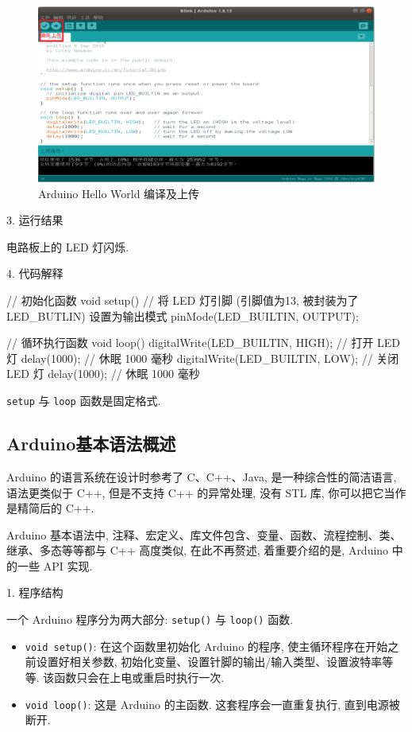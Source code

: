 \documentclass[openany, fontset=windowsold]{ctexbook}
\theoremstyle{kaiti}
\theoremstyle{normal}
\begin{document}
\begin{figure}[!ht]
  \centering
  \includegraphics[width=.9\textwidth]{arduino_HelloWorld_compile.png}
  \caption{Arduino Hello World 编译及上传}
  \label{fig:arduino_HelloWorld_compile}
\end{figure}

3. 运行结果

电路板上的 LED 灯闪烁.

4. 代码解释

\begin{cpp}
  // 初始化函数
  void setup() {
    // 将 LED 灯引脚 (引脚值为13, 被封装为了 LED_BUTLIN) 设置为输出模式
    pinMode(LED_BUILTIN, OUTPUT);
  }

  // 循环执行函数
  void loop() {
    digitalWrite(LED_BUILTIN, HIGH);   // 打开 LED 灯
    delay(1000);                       // 休眠 1000 毫秒
    digitalWrite(LED_BUILTIN, LOW);    // 关闭 LED 灯
    delay(1000);                       // 休眠 1000 毫秒
  }
\end{cpp}

\verb|setup| 与 \verb|loop| 函数是固定格式.

\subsection{Arduino基本语法概述}

Arduino 的语言系统在设计时参考了 C、C++、Java, 是一种综合性的简洁语言, 语法更类似于 C++, 但是不支持 C++ 的异常处理, 没有 STL 库, 你可以把它当作是精简后的 C++.

Arduino 基本语法中, 注释、宏定义、库文件包含、变量、函数、流程控制、类、继承、多态等等都与 C++ 高度类似, 在此不再赘述, 着重要介绍的是, Arduino 中的一些 API 实现.

1. 程序结构

一个 Arduino 程序分为两大部分: \verb|setup()| 与 \verb|loop()| 函数.

\begin{itemize}
  \item \verb|void setup()|: 在这个函数里初始化 Arduino 的程序, 使主循环程序在开始之前设置好相关参数, 初始化变量、设置针脚的输出/输入类型、设置波特率等等. 该函数只会在上电或重启时执行一次.
  \item \verb|void loop()|: 这是 Arduino 的主函数. 这套程序会一直重复执行, 直到电源被断开.
\end{itemize}
\end{document}
